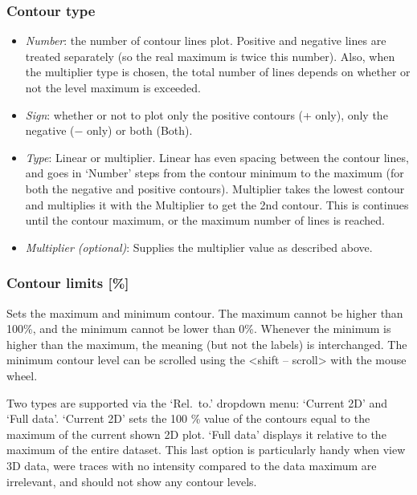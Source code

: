 \documentclass[11pt,a4paper]{article}
\begin{document}
\subsubsection*{Contour type}
\begin{itemize}
  \item \textit{Number}: the number of contour lines plot. Positive and negative lines are treated separately (so the real maximum is twice this number). Also, when
	 the multiplier type is chosen, the total number of lines depends on whether or not the level maximum is exceeded.
  \item \textit{Sign}: whether or not to plot only the positive contours (+ only), only the negative ($-$ only) or both (Both).
  \item \textit{Type}: Linear or multiplier. Linear has even spacing between the contour lines, and goes in `Number' steps from the contour minimum to the
	 maximum (for both the negative and positive contours). Multiplier takes the lowest contour and multiplies it with the Multiplier to get the 2nd contour. This is continues
	 until the contour maximum, or the maximum number of lines is reached.
  \item \textit{Multiplier (optional)}: Supplies the multiplier value as described above.
\end{itemize}


\subsubsection*{Contour limits [\%]}
Sets the maximum and minimum contour. The maximum cannot be higher than 100\%, and the minimum
cannot be lower than 0\%. Whenever the minimum is higher than the maximum, the meaning (but not the
labels) is interchanged. The minimum contour level can be scrolled using the <shift -- scroll> with
the mouse wheel.

Two types are supported via the `Rel.\ to.' dropdown menu: `Current 2D' and `Full data'. `Current
2D' sets the 100 \% value of the contours equal to the maximum of the current shown 2D plot. `Full
data' displays it relative to the maximum of the entire dataset. This last option is particularly
handy when view 3D data, were traces with no intensity compared to the data maximum are irrelevant,
and should not show any contour levels.
\end{document}
